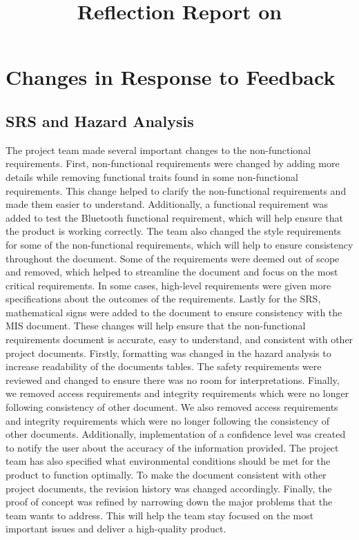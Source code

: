 \documentclass{article}
\title{Reflection Report on \progname}
\author{\authname}
\date{}
\begin{document}
\maketitle

\section{Changes in Response to Feedback}

\subsection{SRS and Hazard Analysis}

The project team made several important changes to the non-functional requirements. First, non-functional requirements were changed by adding more details while removing functional traits found in some non-functional requirements. This change helped to clarify the non-functional requirements and made them easier to understand. Additionally, a functional requirement was added to test the Bluetooth functional requirement, which will help ensure that the product is working correctly. The team also changed the style requirements for some of the non-functional requirements, which will help to ensure consistency throughout the document. Some of the requirements were deemed out of scope and removed, which helped to streamline the document and focus on the most critical requirements. In some cases, high-level requirements were given more specifications about the outcomes of the requirements. Lastly for the SRS, mathematical signs were added to the document to ensure consistency with the MIS document. These changes will help ensure that the non-functional requirements document is accurate, easy to understand, and consistent with other project documents. Firstly, formatting was changed in the hazard analysis to increase readability of the documents tables. The safety requirements were reviewed and changed to ensure there was no room for interpretations. Finally, we removed access requirements and integrity requirements which were no longer following consistency of other document. We also removed access requirements and integrity requirements which were no longer following the consistency of other documents. Additionally, implementation of a confidence level was created to notify the user about the accuracy of the information provided. The project team has also specified what environmental conditions should be met for the product to function optimally. To make the document consistent with other project documents, the revision history was changed accordingly. Finally, the proof of concept was refined by narrowing down the major problems that the team wants to address. This will help the team stay focused on the most important issues and deliver a high-quality product.
\end{document}

